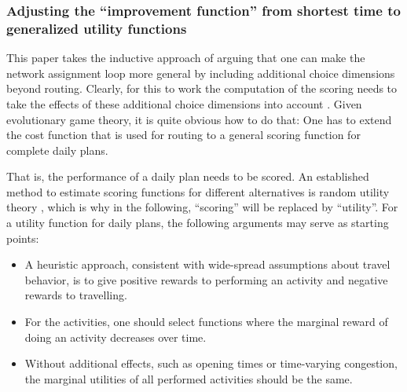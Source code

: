 
\subsubsection{Adjusting the ``improvement function'' from shortest
time to generalized utility functions}
\label{sec:adjust-impr-funct}

\def\perf{{\it perf}}


This paper takes the inductive approach of arguing that one can make
the network assignment loop more general by including additional
choice dimensions beyond routing.  Clearly, for this to work the
computation of the scoring needs to take the effects of these
additional choice dimensions into account \citep[also
  see][]{Balmer2007phd}.  Given evolutionary game theory, it is quite
obvious how to do that: One has to extend the cost
function that is used for routing to a general scoring function for
complete daily plans.


That is, the performance of a daily plan needs to be scored.  An
established method to estimate scoring functions for different
alternatives is random utility theory \citep[e.g.][]{ben-akiva-1985},
which is why in the following, ``scoring'' will be replaced by
``utility''.  For a utility function for daily plans, the following
arguments may serve as starting points:
\begin{itemize}

\item A heuristic approach, consistent with wide-spread assumptions
  about travel behavior, is to give positive rewards to performing an
  activity and negative rewards to travelling.

\item For the activities, one should select functions where the
  marginal reward of doing an activity decreases over time.

\item Without additional effects, such as opening times or
  time-varying congestion, the marginal utilities of all performed
  activities should be the same.  

\end{itemize}

